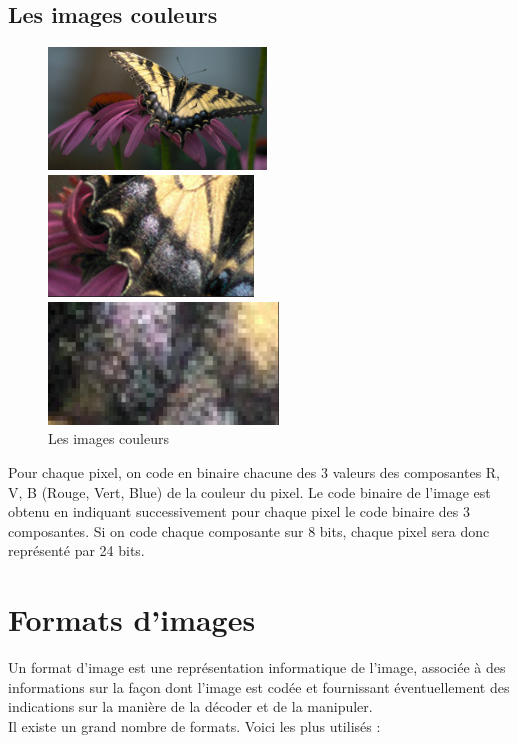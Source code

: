 \documentclass[12pt,a4paper]{report}
\numberwithin{equation}{subsection}
\numberwithin{equation}{section}
\begin{document}
\subsection{Les images couleurs}
\begin{figure}[!h]
    \centering
    \begin{minipage}[b]{0.3\textwidth}
        \includegraphics[height=3.25cm,width=3.5cm\textwidth]{couleur1.jpg}
    \end{minipage}
    \begin{minipage}[b]{0.3\textwidth}
        \includegraphics[height=3.25cm,width=3.5cm\textwidth]{couleur2.png}
    \end{minipage}
    \begin{minipage}[b]{0.3\textwidth}
        \includegraphics[height=3.25cm,width=3.5cm\textwidth]{couleur3.png}
    \end{minipage}
    \caption{Les images couleurs}
\end{figure}
Pour chaque pixel, on code en binaire chacune des 3 valeurs des composantes R, V, B (Rouge, Vert, Blue) de la couleur du pixel. Le code binaire de l'image est obtenu en indiquant successivement pour chaque pixel le code binaire des 3 composantes. Si on code chaque composante sur 8 bits, chaque pixel sera donc représenté par 24 bits.

\newpage


\section{Formats d’images}
Un format d'image est une représentation informatique de l'image, associée à des
informations sur la façon dont l'image est codée et fournissant éventuellement des indications sur la
manière de la décoder et de la manipuler.
\\ 
Il existe un grand nombre de formats. Voici les plus utilisés :\\
\end{document}
